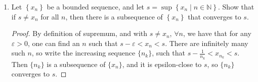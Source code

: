 \documentclass[hidelinks,12pt]{article}
\renewcommand{\epsilon}{\varepsilon}
\begin{document}
\begin{enumerate}
\begin{proof}
\begin{align*}
            L&=-1\pm\sqrt{2}\\
            L&=-1+\sqrt{2}\tag{\text{This limit must be nonnegative}}
        \end{align*} 
    \end{proof}
    \item Let $\left\{x_n\right\}$ be a bounded sequence, and let $s=\sup \left\{x_n \mid n \in \mathbb{N}\right\}$. Show that if $s \neq x_n$ for all $n$, then there is a subsequence of $\left\{x_n\right\}$ that converges to $s$.\begin{proof}
        By definition of supremum, and with $s\neq x_n$, $\forall n$, we have that for any $\epsilon>0$, one can find an $n$ such that $s-\epsilon<x_n<s$. There are infinitely many such $n$, so write the increasing sequence $\{n_k\}$, such that $s-\frac{1}{n_k}<x_{n_k}<s$. Then $\{n_k\}$ is a subsequence of $\{x_n\}$, and it is epsilon-close to $s$, so $\{n_k\}$ converges to $s$.
    \end{proof}
\end{enumerate}
\end{document}

